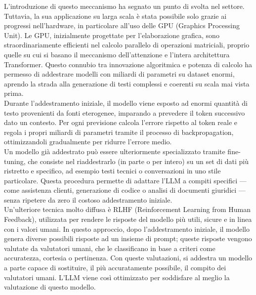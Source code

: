 L’introduzione di questo meccanismo ha segnato un punto di svolta nel settore. Tuttavia, la sua applicazione su larga scala è stata possibile solo grazie ai progressi nell’hardware, in particolare all’uso delle GPU (Graphics Processing Unit). Le GPU, inizialmente progettate per l’elaborazione grafica, sono straordinariamente efficienti nel calcolo parallelo di operazioni matriciali, proprio quelle su cui si basano il meccanismo dell’attenzione e l’intera architettura Transformer. Questo connubio tra innovazione algoritmica e potenza di calcolo ha permesso di addestrare modelli con miliardi di parametri su dataset enormi, aprendo la strada alla generazione di testi complessi e coerenti su scala mai vista prima. \\
Durante l’addestramento iniziale, il modello viene esposto ad enormi quantità di testo provenienti da fonti eterogenee, imparando a prevedere il token successivo dato un contesto. Per ogni previsione calcola l’errore rispetto al token reale e regola i propri miliardi di parametri tramite il processo di backpropagation, ottimizzandoli gradualmente per ridurre l’errore medio. \\
Un modello già addestrato può essere ulteriormente specializzato tramite fine-tuning, che consiste nel riaddestrarlo (in parte o per intero) su un set di dati più ristretto e specifico, ad esempio testi tecnici o conversazioni in uno stile particolare. Questa procedura permette di adattare l’LLM a compiti specifici — come assistenza clienti, generazione di codice o analisi di documenti giuridici — senza ripetere da zero il costoso addestramento iniziale. \\
Un’ulteriore tecnica molto diffusa è RLHF (Reinforcement Learning from Human Feedback), utilizzata per rendere le risposte del modello più utili, sicure e in linea con i valori umani. In questo approccio, dopo l’addestramento iniziale, il modello genera diverse possibili risposte ad un insieme di prompt; queste risposte vengono valutate da valutatori umani, che le classificano in base a criteri come accuratezza, cortesia o pertinenza. Con queste valutazioni, si addestra un modello a parte capace di sostituire, il più accuratamente possibile, il compito dei valutatori umani. L’LLM viene così ottimizzato per soddisfare al meglio la valutazione di questo modello.


